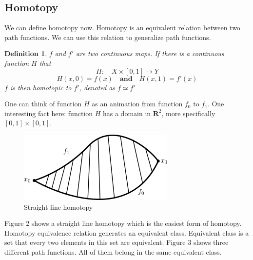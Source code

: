\documentclass[12pt,letterpaper]{article}
\newtheorem{mydef}{Definition}
\begin{document}
\begin{normalsize}
\subsection{Homotopy}
We can define homotopy now. Homotopy is an equivalent relation between two path functions. We can use this relation to generalize path functions. 
\begin{mydef}\label{def:def444} 
  $f$ and $f'$ are two continuous maps. If there is a continuous function $H$ that 
        $$H: \quad X \times [0,1] \rightarrow Y$$
        $$H(x,0)=f(x) \quad \textbf{and} \quad H(x,1)=f'(x)$$
        $f$ is then homotopic to $f'$, denoted as $f \simeq f'$
\end{mydef}
One can think of function $H$ as an animation from function $f_0$ to $f_1$. One interesting fact here: function $H$ has a domain in $\mathbf{R}^2$, more specifically $[0,1] \times [0,1]$.\\[10pt]
\begin{figure}[hbt!]
    \centering
    \includegraphics[scale=0.6]{1}
    \caption{Straight line homotopy}
    \label{fig:my_label}
\end{figure}
Figure 2 shows a straight line homotopy which is the easiest form of homotopy. \\
Homotopy equivalence relation generates an equivalent class. Equivalent class is a set that every two elements in this set are equivalent. Figure 3 shows three different path functions. All of them belong in the same equivalent class.
\begin{figure}[hbt!]
    \centering
\end{figure}
\end{normalsize}
\end{document}
